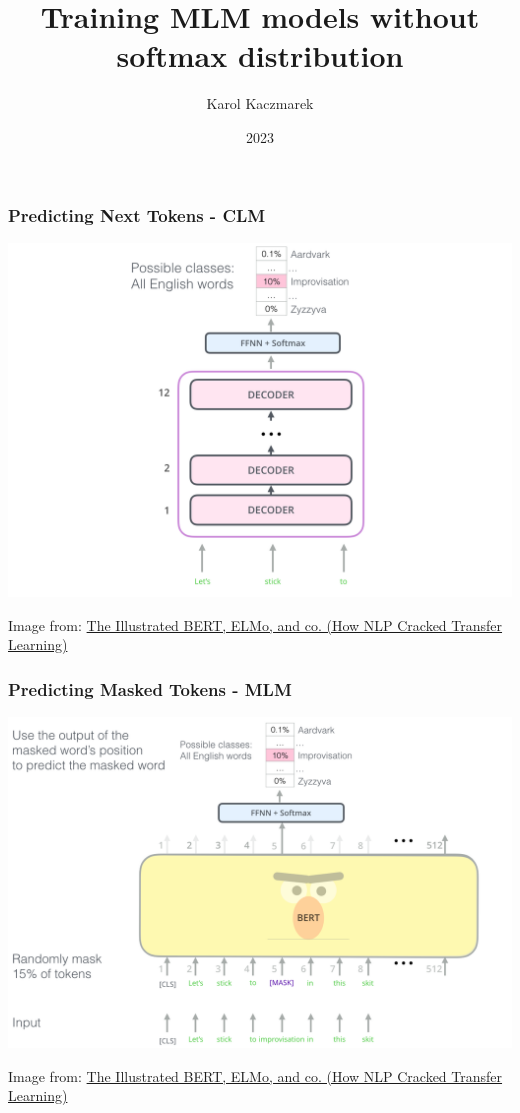 \documentclass{beamer}
\title{Training MLM models without softmax distribution}
\date{2023}
\author{Karol Kaczmarek}
\begin{document}
\begin{frame}
    \titlepage
\end{frame}

\begin{frame}
    \frametitle{Predicting Next Tokens - CLM}
    \begin{center}
        \includegraphics[scale=0.2]{img/clm.png}
    \end{center}
     \tiny Image from: \href{https://jalammar.github.io/illustrated-bert/}{The Illustrated BERT, ELMo, and co. (How NLP Cracked Transfer Learning)}
\end{frame}

\begin{frame}
    \frametitle{Predicting Masked Tokens - MLM}
    \begin{center}
        \includegraphics[scale=0.2]{img/mlm.png}
    \end{center}
     \tiny Image from: \href{https://jalammar.github.io/illustrated-bert/}{The Illustrated BERT, ELMo, and co. (How NLP Cracked Transfer Learning)}
\end{frame}
\end{document}
